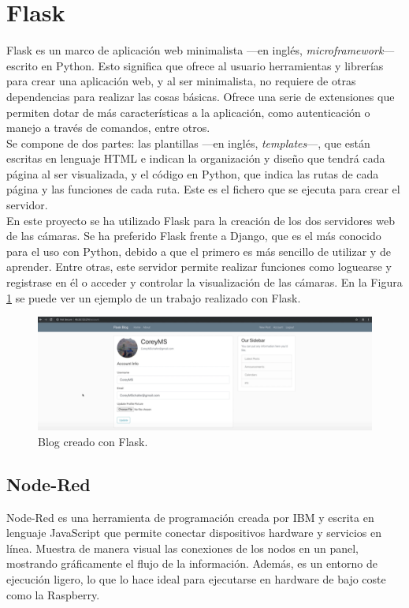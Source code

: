 \section{Flask}
\label{sec:flask}
Flask es un marco de aplicación web minimalista ---en inglés, \textit{microframework}--- escrito en Python. Esto significa que ofrece al usuario herramientas y librerías para crear una aplicación web, y al ser minimalista, no requiere de otras dependencias para realizar las cosas básicas. Ofrece una serie de extensiones que permiten dotar de más características a la aplicación, como autenticación o manejo a través de comandos, entre otros.\\

Se compone de dos partes: las plantillas ---en inglés, \textit{templates}---, que están escritas en lenguaje HTML e indican la organización y diseño que tendrá cada página al ser visualizada, y el código en Python, que indica las rutas de cada página y las funciones de cada ruta. Este es el fichero que se ejecuta para crear el servidor.\\

En este proyecto se ha utilizado Flask para la creación de los dos servidores web de las cámaras. Se ha preferido Flask frente a Django, que es el más conocido para el uso con Python, debido a que el primero es más sencillo de utilizar y de aprender. Entre otras, este servidor permite realizar funciones como loguearse y registrase en él o acceder y controlar la visualización de las cámaras. En la Figura \ref{fig:flask-internet} se puede ver un ejemplo de un trabajo realizado con Flask.\\
\begin{figure} [h!]
  \begin{center}
    \includegraphics[width=15cm]{figs/flask-internet}
  \end{center}
  \caption{Blog creado con Flask.}
  \label{fig:flask-internet}
\end{figure}

\subsection{Node-Red}
\label{sec:nodered}
Node-Red es una herramienta de programación creada por IBM y escrita en lenguaje JavaScript que permite conectar dispositivos hardware y servicios en línea. Muestra de manera visual las conexiones de los nodos en un panel, mostrando gráficamente el flujo de la información. Además, es un entorno de ejecución ligero, lo que lo hace ideal para ejecutarse en hardware de bajo coste como la Raspberry.\\

